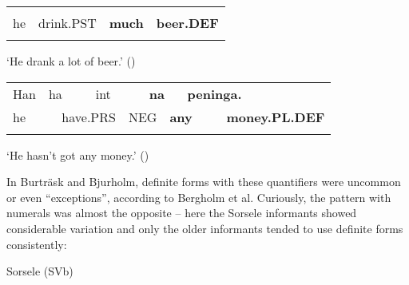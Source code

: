 \begin{tabular}{llll}
\lsptoprule
\multicolumn{4}{l}{Han

}\\
he & drink.PST & {\bfseries much} & {\bfseries beer.DEF}\\
\lspbottomrule
\end{tabular}

\begin{styleTranslation}
‘He drank a lot of beer.’ (\citet[24]{BergholmEtAl1999})

\end{styleTranslation}

\begin{tabular}{llllllllll}
\lsptoprule
Han & \multicolumn{2}{l}{ha

} & \multicolumn{2}{l}{int

} & \multicolumn{2}{l}{{\bfseries na}

} & \multicolumn{2}{l}{{\bfseries peninga.}

} & \\
\multicolumn{2}{l}{he

} & \multicolumn{2}{l}{have.PRS

} & \multicolumn{2}{l}{NEG

} & \multicolumn{2}{l}{{\bfseries any}

} & \multicolumn{2}{l}{{\bfseries money.PL.DEF}

}\\
\lspbottomrule
\end{tabular}

\begin{styleTranslation}
‘He hasn’t got any money.’ (\citet[24]{BergholmEtAl1999})

\end{styleTranslation}

\begin{styleBodyTextFirst}
In Burträsk and Bjurholm, definite forms with these quantifiers were uncommon or even “exceptions”, according to Bergholm et al. Curiously, the pattern with numerals was almost the opposite – here the Sorsele informants showed considerable variation and only the older informants tended to use definite forms consistently:

\end{styleBodyTextFirst}


\begin{listWWNumileveli}
\item {}

\begin{styleExample}
Sorsele (SVb) 

\end{styleExample}

\end{listWWNumileveli}

